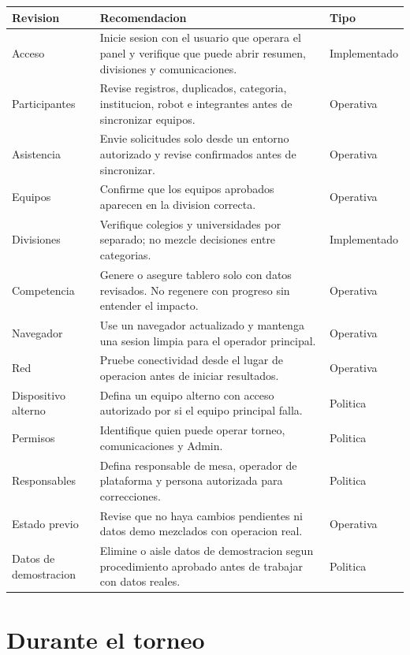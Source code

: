 \begin{longtable}{p{3.4cm}p{7.6cm}p{2.0cm}}
\toprule
Revision & Recomendacion & Tipo\\
\midrule
\endhead
Acceso & Inicie sesion con el usuario que operara el panel y verifique que puede abrir resumen, divisiones y comunicaciones. & Implementado\\
Participantes & Revise registros, duplicados, categoria, institucion, robot e integrantes antes de sincronizar equipos. & Operativa\\
Asistencia & Envie solicitudes solo desde un entorno autorizado y revise confirmados antes de sincronizar. & Operativa\\
Equipos & Confirme que los equipos aprobados aparecen en la division correcta. & Operativa\\
Divisiones & Verifique colegios y universidades por separado; no mezcle decisiones entre categorias. & Implementado\\
Competencia & Genere o asegure tablero solo con datos revisados. No regenere con progreso sin entender el impacto. & Operativa\\
Navegador & Use un navegador actualizado y mantenga una sesion limpia para el operador principal. & Operativa\\
Red & Pruebe conectividad desde el lugar de operacion antes de iniciar resultados. & Operativa\\
Dispositivo alterno & Defina un equipo alterno con acceso autorizado por si el equipo principal falla. & Politica\\
Permisos & Identifique quien puede operar torneo, comunicaciones y Admin. & Politica\\
Responsables & Defina responsable de mesa, operador de plataforma y persona autorizada para correcciones. & Politica\\
Estado previo & Revise que no haya cambios pendientes ni datos demo mezclados con operacion real. & Operativa\\
Datos de demostracion & Elimine o aisle datos de demostracion segun procedimiento aprobado antes de trabajar con datos reales. & Politica\\
\bottomrule
\end{longtable}

\section{Durante el torneo}


